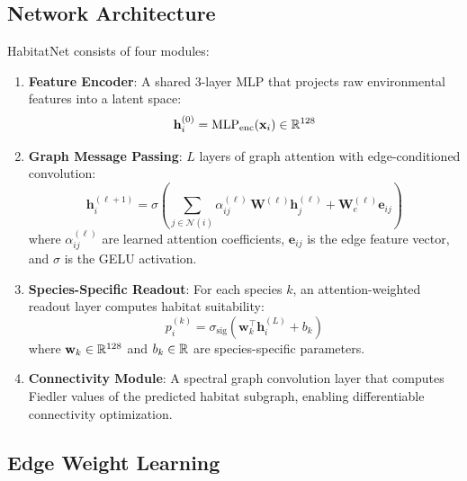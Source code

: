 \subsection{Network Architecture}

HabitatNet consists of four modules:

\begin{enumerate}
  \item \textbf{Feature Encoder}: A shared 3-layer MLP that projects raw
    environmental features into a latent space:
    \begin{equation}
      \mathbf{h}_i^{(0)} = \text{MLP}_{\text{enc}}(\mathbf{x}_i)
      \in \mathbb{R}^{128}
    \end{equation}

  \item \textbf{Graph Message Passing}: $L$ layers of graph attention
    \citep{velickovic2018graph} with edge-conditioned convolution:
    \begin{equation}
      \mathbf{h}_i^{(\ell+1)} = \sigma\!\left(
        \sum_{j \in \mathcal{N}(i)} \alpha_{ij}^{(\ell)} \,
        \mathbf{W}^{(\ell)} \mathbf{h}_j^{(\ell)} +
        \mathbf{W}_e^{(\ell)} \mathbf{e}_{ij}
      \right)
    \end{equation}
    where $\alpha_{ij}^{(\ell)}$ are learned attention coefficients,
    $\mathbf{e}_{ij}$ is the edge feature vector, and
    $\sigma$ is the GELU activation.

  \item \textbf{Species-Specific Readout}: For each species $k$, an
    attention-weighted readout layer computes habitat suitability:
    \begin{equation}
      p_i^{(k)} = \sigma_{\text{sig}}\!\left(
        \mathbf{w}_k^\top \mathbf{h}_i^{(L)} + b_k
      \right)
    \end{equation}
    where $\mathbf{w}_k \in \mathbb{R}^{128}$ and $b_k \in \mathbb{R}$ are
    species-specific parameters.

  \item \textbf{Connectivity Module}: A spectral graph convolution layer
    that computes Fiedler values \citep{fiedler1973algebraic} of the
    predicted habitat subgraph, enabling differentiable connectivity
    optimization.
\end{enumerate}

\subsection{Edge Weight Learning}
\label{sec:edge_learning}

